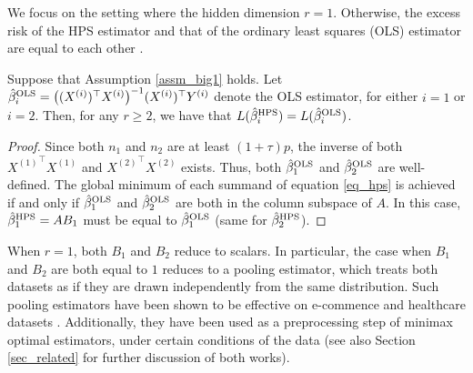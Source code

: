 We focus on the setting where the hidden dimension $r = 1$.
Otherwise, the excess risk of the HPS estimator and that of the ordinary least squares (OLS) estimator are equal to each other \cite{WZR20}.
\begin{proposition}\label{prop_large_r}
    Suppose that Assumption \ref{assm_big1} holds.
    Let $\hat{\beta}_i^{\textup{OLS}} = \big( (X^{(i)})^{\top} X^{(i)} \big)^{-1} (X^{(i)})^{\top} Y^{(i)}$ denote the OLS estimator, for either $i = 1$ or $i = 2$.
    Then, for any $r \ge 2$, we have that $L(\hat{\beta}_i^{\textup{HPS}}) = L(\hat{\beta}_i^{\textup{OLS}})$.
\end{proposition}

\begin{proof}
    Since both $n_1$ and $n_2$ are at least $(1 + \tau) p$, the inverse of both ${X^{(1)}}^{\top} X^{(1)}$ and ${X^{(2)}}^{\top} X^{(2)}$ exists.
    Thus, both $\hat{\beta}_1^{\textup{OLS}}$ and $\hat{\beta}_2^{\textup{OLS}}$ are well-defined.
    The global minimum of each summand of equation \eqref{eq_hps} is achieved if and only if $\hat{\beta}_1^{\textup{OLS}}$ and $\hat{\beta}_2^{\textup{OLS}}$ are both in the column subspace of $A$.
    In this case, $\hat{\beta}_1^{\textup{HPS}} = A B_1$ must be equal to $\hat{\beta}_1^{\textup{OLS}}$ (same for $\hat{\beta}_2^{\textup{HPS}}$).
\end{proof}

When $r = 1$, both $B_1$ and $B_2$ reduce to scalars.
In particular, the case when $B_1$ and $B_2$ are both equal to $1$ reduces to a pooling estimator, which treats both datasets as if they are drawn independently from the same distribution.
Such pooling estimators have been shown to be effective on e-commence and healthcare datasets \cite{bastani2020predicting}.
Additionally, they have been used as a preprocessing step of minimax optimal estimators, under certain conditions of the data \cite{li2020transfer} (see also Section \ref{sec_related} for further discussion of both works).





